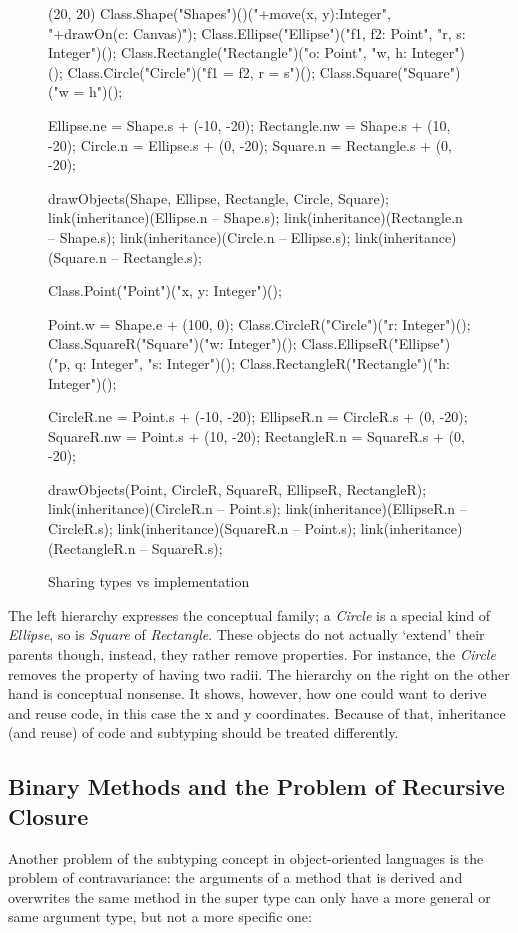 \begin{figure}[H]
	\centering
	\begin{emp}[classdiag](20, 20)
		Class.Shape("Shapes")()("+move(x, y):Integer", "+drawOn(c: Canvas)");
		Class.Ellipse("Ellipse")("f1, f2: Point", "r, s: Integer")();
		Class.Rectangle("Rectangle")("o: Point", "w, h: Integer")();
		Class.Circle("Circle")("{f1 = f2, r = s}")();
		Class.Square("Square")("{w = h}")();

		Ellipse.ne = Shape.s + (-10, -20);
		Rectangle.nw = Shape.s + (10, -20);
		Circle.n = Ellipse.s + (0, -20);
		Square.n = Rectangle.s + (0, -20);

		drawObjects(Shape, Ellipse, Rectangle, Circle, Square);
		link(inheritance)(Ellipse.n -- Shape.s);
		link(inheritance)(Rectangle.n -- Shape.s);
		link(inheritance)(Circle.n -- Ellipse.s);
		link(inheritance)(Square.n -- Rectangle.s);

		Class.Point("Point")("x, y: Integer")();

		Point.w = Shape.e + (100, 0);
		Class.CircleR("Circle")("r: Integer")();
		Class.SquareR("Square")("w: Integer")();
		Class.EllipseR("Ellipse")("p, q: Integer", "s: Integer")();
		Class.RectangleR("Rectangle")("h: Integer")();

		CircleR.ne = Point.s + (-10, -20);
		EllipseR.n = CircleR.s + (0, -20);
		SquareR.nw = Point.s + (10, -20);
		RectangleR.n = SquareR.s + (0, -20);

		drawObjects(Point, CircleR, SquareR, EllipseR, RectangleR);
		link(inheritance)(CircleR.n -- Point.s);
		link(inheritance)(EllipseR.n -- CircleR.s);
		link(inheritance)(SquareR.n -- Point.s);
		link(inheritance)(RectangleR.n -- SquareR.s);
	\end{emp}
	\caption{Sharing types vs implementation}
	\label{fig:implementationConflict}
\end{figure}

The left hierarchy expresses the conceptual family; a \emph{Circle}
is a special kind of \emph{Ellipse}, so is \emph{Square} of
\emph{Rectangle}. These objects do not actually `extend' their parents
though, instead, they rather remove properties. For instance, the
\emph{Circle} removes the property of having two radii. The hierarchy on
the right on the other hand is conceptual nonsense. It shows, however,
how one could want to derive and reuse code, in this case the x and
y coordinates. Because of that, inheritance (and reuse) of code and
subtyping should be treated differently.

\subsection{Binary Methods and the Problem of Recursive Closure}
\label{sec:recursiveClosure}
Another problem of the subtyping concept in object-oriented languages is
the problem of contravariance: the arguments of a method that is derived
and overwrites the same method in the super type can only have a more
general or same argument type, but not a more specific one:


